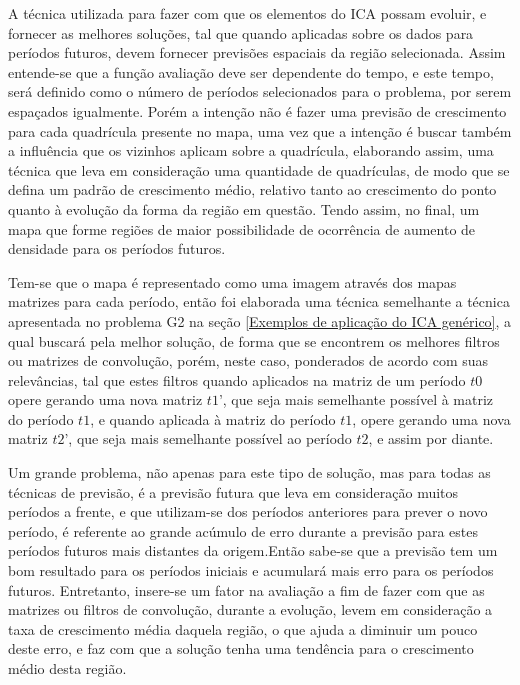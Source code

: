 A técnica utilizada para fazer com que os elementos do ICA possam evoluir, e fornecer as melhores soluções, tal que quando aplicadas sobre os dados para períodos futuros, devem fornecer previsões espaciais da região selecionada. Assim  entende-se que a função avaliação deve ser dependente do tempo, e este tempo, será definido como o número de períodos selecionados para o problema, por serem espaçados igualmente. Porém a intenção não é fazer uma previsão de crescimento para cada quadrícula presente no mapa, uma vez que a intenção é buscar também a influência que os vizinhos aplicam sobre a quadrícula, elaborando assim, uma técnica que leva em consideração uma quantidade de quadrículas, de modo que se defina um padrão de crescimento médio, relativo tanto ao crescimento do ponto quanto à evolução da forma da região em questão. Tendo assim, no final, um mapa que forme regiões de maior possibilidade de ocorrência de aumento de densidade para os períodos futuros.

Tem-se que o mapa é representado como uma imagem através dos mapas matrizes para cada período, então foi elaborada uma técnica  semelhante a técnica apresentada no problema G2 na seção \ref{Exemplos de aplicação do ICA genérico}, a qual buscará pela melhor solução, de forma que se encontrem os melhores filtros ou matrizes de convolução, porém, neste caso,  ponderados de acordo com suas relevâncias, tal que estes filtros quando aplicados na matriz de um período \(t0\) opere gerando uma nova matriz \(t1’\), que seja mais semelhante possível à matriz do período \(t1\), e quando aplicada à matriz do período \(t1\), opere gerando uma nova matriz \(t2’\), que seja mais semelhante possível ao período \(t2\), e assim por diante.

Um grande problema, não apenas para este tipo de solução, mas para todas as técnicas de previsão, é a previsão futura que leva em consideração muitos períodos a frente, e que utilizam-se dos períodos anteriores para prever o novo período, é  referente ao grande acúmulo de erro durante a previsão para estes períodos futuros mais distantes da origem.Então sabe-se que a previsão tem um bom resultado para os períodos iniciais e acumulará mais erro para os períodos futuros. Entretanto, insere-se um fator na avaliação a fim de fazer com que as matrizes ou filtros de convolução, durante a evolução, levem em consideração a taxa de crescimento média daquela região, o que ajuda a diminuir um pouco deste erro, e faz com que a solução tenha uma tendência para o crescimento médio desta região.


